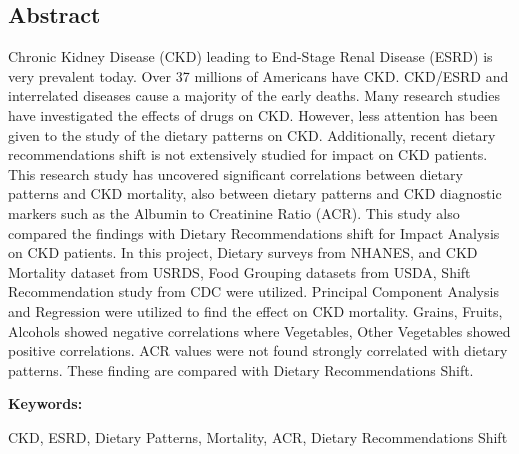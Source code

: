\begin{center} \section*{Abstract} \end{center}
Chronic Kidney Disease (CKD) leading to End-Stage Renal Disease (ESRD) is very prevalent today. Over 37 millions of Americans have CKD. CKD/ESRD and interrelated diseases cause a majority of the early deaths.  Many research studies have investigated the effects of drugs on CKD. However, less attention has been given to the study of the dietary patterns on CKD. Additionally, recent dietary recommendations shift is not extensively studied for impact on CKD patients. This research study has uncovered significant correlations between dietary patterns and CKD mortality, also between  dietary patterns  and CKD diagnostic markers such as the Albumin to Creatinine Ratio (ACR). This study also compared the findings with Dietary Recommendations shift for Impact Analysis on CKD patients. In this project, Dietary surveys from NHANES, and CKD Mortality dataset from USRDS, Food Grouping datasets from USDA, Shift Recommendation study from CDC were utilized. Principal Component Analysis and Regression were utilized to find the effect on CKD mortality. Grains, Fruits, Alcohols showed negative correlations where Vegetables, Other Vegetables showed positive correlations. ACR values were not found strongly correlated with dietary patterns. These finding are compared with Dietary Recommendations Shift.

\medskip
\noindent \textbf{Keywords:} 

\noindent CKD, ESRD, Dietary Patterns, Mortality, ACR, Dietary Recommendations Shift